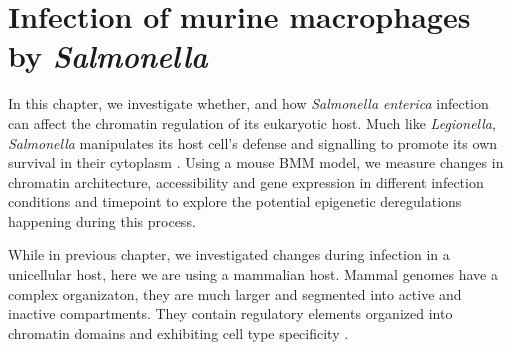\textsc{}%

\chapter{Infection of murine macrophages by \textit{Salmonella}} %

\label{ch:02-03} %


In this chapter, we investigate whether, and how \textit{Salmonella enterica} infection can affect the chromatin regulation of its eukaryotic host. Much like \textit{Legionella}, \textit{Salmonella} manipulates its host cell's defense and signalling to promote its own survival in their cytoplasm \cite{larockSalmonellaeInteractionsHost2015}. Using a mouse \acrfull{BMM} model, we measure changes in chromatin architecture, accessibility and gene expression in different infection conditions and timepoint to explore the potential epigenetic deregulations happening during this process.

While in previous chapter, we investigated changes during infection in a unicellular host, here we are using a mammalian host. Mammal genomes have a complex organizaton, they are much larger and segmented into active and inactive compartments. They contain regulatory elements organized into chromatin domains and exhibiting cell type specificity \cite{schmittCompendiumChromatinContact2016}.

